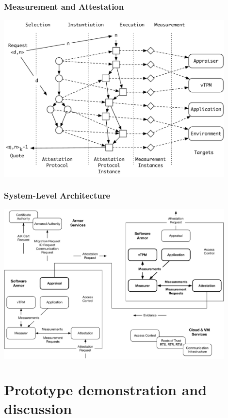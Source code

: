 \documentclass{beamer}
\begin{document}
\begin{frame}
  \frametitle{Measurement and Attestation}
  \begin{center}
  \includegraphics[width=0.9\textwidth]{figures/ap-1.pdf}
  \end{center}
\end{frame}

\begin{frame}
  \frametitle{System-Level Architecture}
  \begin{center}
  \includegraphics[width=0.9\textwidth]{figures/system.pdf}
  \end{center}
\end{frame}

\section{Prototype demonstration and discussion}
\end{document}
